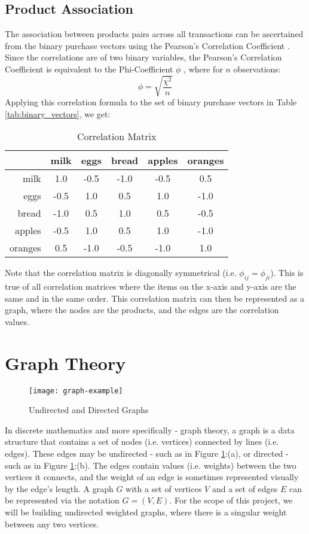 \subsection{Product Association}
The association between products pairs across all transactions can be ascertained from the binary purchase vectors using the Pearson's Correlation Coefficient . Since the correlations are of two binary variables, the Pearson's Correlation Coefficient is equivalent to the Phi-Coefficient $\phi$ , where for $n$ observations:
\[
\phi = \sqrt{\frac{\chi^2}{n}}
\]
Applying this correlation formula to the set of binary purchase vectors in Table \ref{tab:binary_vectors}, we get:
\begin{table}[H]
\centering
\begin{tabular}{@{}r|ccccc@{}}
\toprule
 & milk & eggs & bread & apples & oranges \\ \midrule
milk &   1.0    & -0.5    & -1.0     & -0.5      & 0.5       \\ \bottomrule
eggs &   -0.5    & 1.0    & 0.5     & 1.0      & -1.0       \\ \bottomrule
bread &  -1.0    & 0.5    & 1.0     & 0.5      & -0.5       \\ \bottomrule
apples & -0.5    & 1.0    & 0.5     & 1.0     & -1.0      \\ \bottomrule
oranges& 0.5    & -1.0    & -0.5     & -1.0      & 1.0      \\ \bottomrule
\end{tabular}
\caption{Correlation Matrix}
\label{tab:correlation}
\end{table}
\noindent Note that the correlation matrix is diagonally symmetrical (i.e. $\phi_{ij} = \phi_{ji}$). This is true of all correlation matrices where the items on the x-axis and y-axis are the same and in the same order. This correlation matrix can then be represented as a graph, where the nodes are the products, and the edges are the correlation values.

\section{Graph Theory}
\begin{figure}[H]
\centering
\texttt{[image: graph-example]}
\caption{Undirected and Directed Graphs}
\label{fig:graph.example}
\end{figure}
In discrete mathematics and more specifically - graph theory, a graph is a data structure that contains a set of nodes (i.e. vertices) connected by lines (i.e. edges).  These edges may be undirected - such as in Figure \ref{fig:graph.example}:(a), or directed - such as in Figure \ref{fig:graph.example}:(b). The edges contain values (i.e. weights) between the two vertices it connects, and the weight of an edge is sometimes represented visually by the edge's length. A graph $G$ with a set of vertices $V$ and a set of edges $E$ can be represented via the notation $G = (V,E)$. For the scope of this project,  we will be building undirected weighted graphs, where there is a singular weight between any two vertices.

